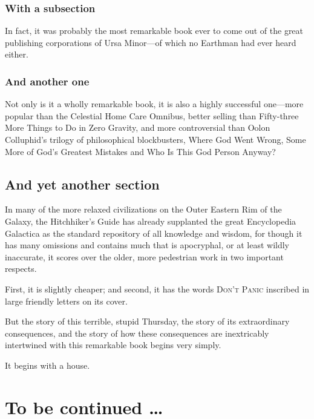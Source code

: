 \documentclass[a4paper, twocolumn, openany]{book}
\begin{document}
	\subsection{With a subsection}
	
	In fact, it was probably the most remarkable book ever to come out of the great publishing corporations of Ursa Minor—of which no Earthman had ever heard either.
	
	\subsection{And another one}
	
	Not only is it a wholly remarkable book, it is also a highly successful one—more popular than the Celestial Home Care Omnibus, better selling than Fifty-three More Things to Do in Zero Gravity, and more controversial than Oolon Colluphid’s trilogy of philosophical blockbusters, Where God Went Wrong, Some More of God’s Greatest Mistakes and Who Is This God Person Anyway?
	
	\section{And yet another section}
	
	In many of the more relaxed civilizations on the Outer Eastern Rim of the Galaxy, the Hitchhiker’s Guide has already supplanted the great Encyclopedia Galactica as the standard repository of all knowledge and wisdom, for though it has many omissions and contains much that is apocryphal, or at least wildly inaccurate, it scores over the older, more pedestrian work in two important respects.
	
	First, it is slightly cheaper; and second, it has the words \textsc{Don't Panic} inscribed in large friendly letters on its cover.
	
	But the story of this terrible, stupid Thursday, the story of its extraordinary consequences, and the story of how these consequences are inextricably intertwined with this remarkable book begins very simply.
	
	It begins with a house.
	
	\newpage
	
	\chapter*{To be continued \ldots}
		
\end{document}
